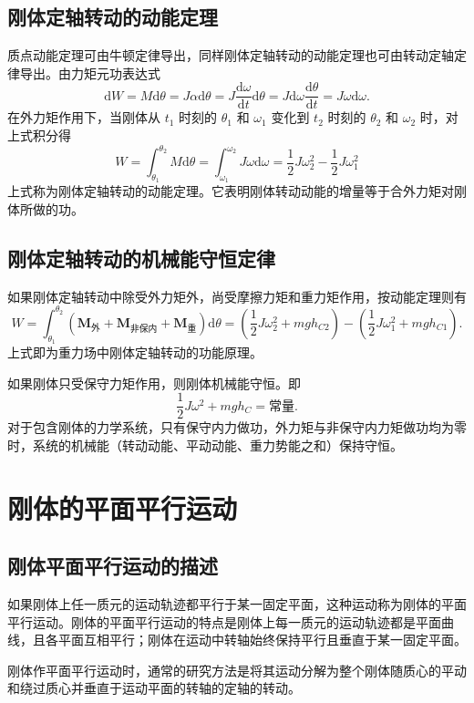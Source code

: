     \subsection{刚体定轴转动的动能定理}
    质点动能定理可由牛顿定律导出，同样刚体定轴转动的动能定理也可由转动定轴定律导出。由力矩元功表达式
    \[
    \mathrm{d}W=M\mathrm{d}\theta=J\alpha \mathrm{d}\theta=J\frac{\mathrm{d}\omega}{\mathrm{d}t}\mathrm{d}\theta=J\mathrm{d}\omega \frac{\mathrm{d}\theta}{\mathrm{d}t}=J\omega \mathrm{d}\omega.
    \]
    在外力矩作用下，当刚体从 $t_1$ 时刻的 $\theta_1$ 和 $\omega_1$ 变化到 $t_2$ 时刻的 $\theta_2$ 和 $\omega_2$ 时，对上式积分得
    \[
    W=\int_{\theta_1}^{\theta_2} M \mathrm{d}\theta=\int_{\omega_1}^{\omega_2} J \omega \mathrm{d}\omega=\frac12 J \omega_2^2-\frac12 J \omega_1^2
    \]
    上式称为刚体定轴转动的动能定理。它表明刚体转动动能的增量等于合外力矩对刚体所做的功。

    \subsection{刚体定轴转动的机械能守恒定律}
    如果刚体定轴转动中除受外力矩外，尚受摩擦力矩和重力矩作用，按动能定理则有
    \[
    W=\int_{\theta_1}^{\theta_2} \left(\boldsymbol{M}_\text{外}+\boldsymbol{M}_\text{非保内}+\boldsymbol{M}_\text{重}\right)\mathrm{d}\theta=\left(\frac12 J \omega_2^2+m g h_{C2}\right)-\left(\frac12 J \omega_1^2+m g h_{C1}\right).
    \]
    上式即为重力场中刚体定轴转动的功能原理。

    如果刚体只受保守力矩作用，则刚体机械能守恒。即
    \[
    \frac12 J\omega^2 + m g h_C = \text{常量}.
    \]
    对于包含刚体的力学系统，只有保守内力做功，外力矩与非保守内力矩做功均为零时，系统的机械能（转动动能、平动动能、重力势能之和）保持守恒。

\section{刚体的平面平行运动}
    \subsection{刚体平面平行运动的描述}
    如果刚体上任一质元的运动轨迹都平行于某一固定平面，这种运动称为刚体的平面平行运动。刚体的平面平行运动的特点是刚体上每一质元的运动轨迹都是平面曲线，且各平面互相平行；刚体在运动中转轴始终保持平行且垂直于某一固定平面。

    刚体作平面平行运动时，通常的研究方法是将其运动分解为整个刚体随质心的平动和绕过质心并垂直于运动平面的转轴的定轴的转动。

